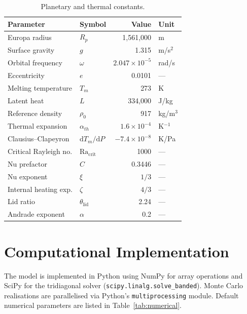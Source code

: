 \documentclass[11pt,a4paper]{article}
\newcommand{\dd}{\mathrm{d}}
\newcommand{\Ra}{\mathrm{Ra}}
\begin{document}
\begin{table}[h]
\centering
\caption{Planetary and thermal constants.}
\label{tab:constants}
\begin{tabular}{llrl}
\toprule
\textbf{Parameter} & \textbf{Symbol} & \textbf{Value} & \textbf{Unit} \\
\midrule
Europa radius         & $R_p$           & 1,561,000  & m \\
Surface gravity       & $g$             & 1.315      & m/s$^2$ \\
Orbital frequency     & $\omega$        & $2.047 \times 10^{-5}$ & rad/s \\
Eccentricity          & $e$             & 0.0101     & --- \\
Melting temperature   & $T_m$           & 273        & K \\
Latent heat           & $L$             & 334,000    & J/kg \\
Reference density     & $\rho_0$        & 917        & kg/m$^3$ \\
Thermal expansion     & $\alpha_{th}$   & $1.6 \times 10^{-4}$ & K$^{-1}$ \\
Clausius--Clapeyron   & $\dd T_m/\dd P$ & $-7.4 \times 10^{-8}$ & K/Pa \\
Critical Rayleigh no. & $\Ra_{\mathrm{crit}}$ & 1000  & --- \\
Nu prefactor          & $C$             & 0.3446     & --- \\
Nu exponent           & $\xi$           & $1/3$      & --- \\
Internal heating exp. & $\zeta$         & $4/3$      & --- \\
Lid ratio             & $\theta_{\mathrm{lid}}$ & 2.24 & --- \\
Andrade exponent      & $\alpha$        & 0.2        & --- \\
\bottomrule
\end{tabular}
\end{table}

\section{Computational Implementation}
\label{sec:implementation}

The model is implemented in Python using NumPy for array operations and
SciPy for the tridiagonal solver (\texttt{scipy.linalg.solve\_banded}).
Monte Carlo realisations are parallelised via Python's
\texttt{multiprocessing} module. Default numerical parameters are listed
in Table~\ref{tab:numerical}.
\end{document}
